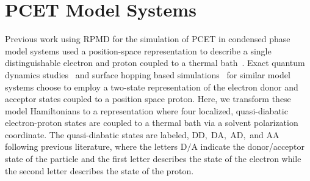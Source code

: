 \documentclass[phd,tocprelim]{cornell}
\begin{document}
\section{PCET Model Systems} 

Previous work using RPMD for the simulation of PCET in
condensed phase model systems used a position-space 
representation to describe a single distinguishable 
electron and proton coupled to a thermal bath~\cite{TFM2013}. 
Exact quantum dynamics studies~\cite{NA2012} and 
surface hopping based simulations~\cite{SHS1997}
for similar model systems choose to employ 
a two-state representation of the electron donor
and acceptor states coupled to a position space 
proton. Here, we transform these 
model Hamiltonians to a representation where 
four localized, quasi-diabatic electron-proton 
states are coupled to a thermal bath via a solvent 
polarization coordinate. The quasi-diabatic states are labeled,
$\textrm{DD},\;\textrm{DA},\;\textrm{AD},$ and $\textrm{AA}$ 
following previous literature, where the letters 
$\textrm{D}/\textrm{A}$ indicate the donor/acceptor state of the 
particle and the first letter describes the state of the electron
while the second letter describes the state of the proton.
\end{document}
